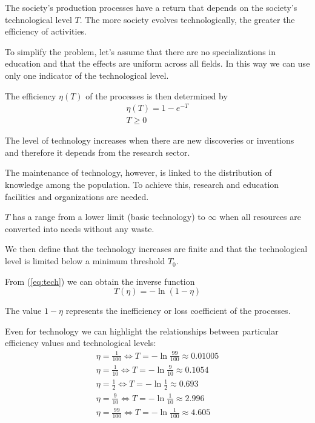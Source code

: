 \documentclass[a4paper,twoside]{article}
\begin{document}
The society's production processes have a return that depends on the society's technological level $ T $.
The more society evolves technologically, the greater the efficiency of activities.

To simplify the problem, let's assume that there are no specializations in education and that the effects are uniform across all fields.
In this way we can use only one indicator of the technological level.

The efficiency $ \eta(T) $ of the processes is then determined by
\begin{align}\label{eq:tech}
	\eta(T) = 1-e^{-T}
	\\
	T \ge 0	
\end{align}

The level of technology increases when there are new discoveries or inventions and therefore it depends from the research sector.

The maintenance of technology, however, is linked to the distribution of knowledge among the population.
To achieve this, research and education facilities and organizations are needed.

$ T $ has a range from a lower limit (basic technology) to $\infty$ when all resources are converted into needs without any waste.

We then define that the technology increases are finite and that the technological level is limited below a minimum threshold $ T_0 $.


From (\ref{eq:tech}) we can obtain the inverse function
\begin{equation*}
	T(\eta) = -\ln(1 - \eta)
\end{equation*}

The value $ 1 - \eta $ represents the inefficiency or loss coefficient of the processes.

Even for technology we can highlight the relationships between particular efficiency values and technological levels:
\begin{align*}
	\eta=\frac{1}{100} \Leftrightarrow T = -\ln \frac{99}{100}
	\approx 0.01005
	\\
	\eta=\frac{1}{10} \Leftrightarrow T = -\ln \frac{9}{10}
	\approx 0.1054
	\\
	\eta=\frac{1}{2} \Leftrightarrow T = -\ln \frac{1}{2}
	\approx 0.693
	\\
	\eta=\frac{9}{10} \Leftrightarrow T = -\ln \frac{1}{10}
	\approx 2.996
	\\
	\eta=\frac{99}{100} \Leftrightarrow T = -\ln \frac{1}{100}
	\approx 4.605
\end{align*}
\end{document}
